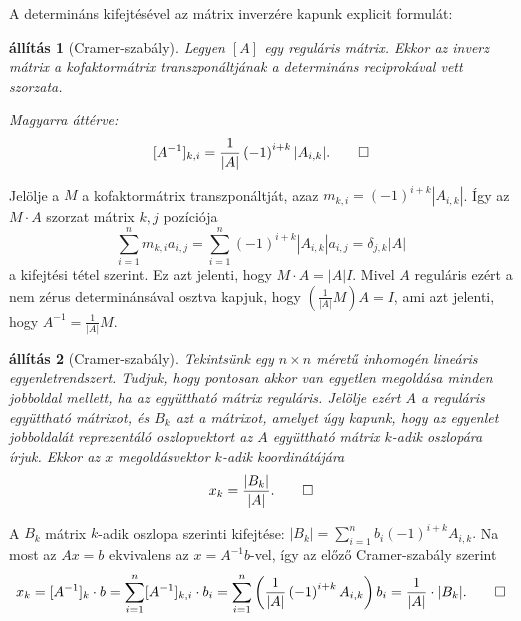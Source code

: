 \documentclass[a4paper, showtrims]{memoir}
\makeatletter
\renewenvironment{proof}[1][\proofname]
    {\par\pushQED{\qed}%
    \normalfont \topsep6\p@\@plus6\p@\relax
    \trivlist
    \item[\hskip\labelsep
        \itshape
    #1\@addpunct{:}]\ignorespaces}
    {\popQED\endtrivlist\@endpefalse}
\theoremstyle{plain}
\newtheorem{proposition}{állítás}[chapter]
\theoremstyle{remark}
\theoremstyle{definition}
\makeatother
\begin{document}
A determináns kifejtésével az mátrix inverzére kapunk explicit formulát:
\begin{proposition}[Cramer-szabály]
	Legyen $[A]$ egy reguláris mátrix.
	Ekkor az inverz mátrix a kofaktormátrix transzponáltjának a determináns reciprokával vett szorzata.

	Magyarra áttérve:
	\[
		[A^{-1}]_{k,i}=\frac{1}{|A|}\left( -1 \right)^{i+k}|A_{i,k}|.\qedhere
	\]
\end{proposition}
\begin{proof}
	Jelölje a $M$ a kofaktormátrix transzponáltját,
	azaz $m_{k,i}=\left( -1 \right)^{i+k}|A_{i,k}|$.
	Így az $M\cdot A$ szorzat mátrix $k,j$ pozíciója
	\[
		\sum_{i=1}^nm_{k,i}a_{i,j}
		=
		\sum_{i=1}^n
		\left( -1 \right)^{i+k}|A_{i,k}|
		a_{i,j}
		=\delta_{j,k}|A|
	\]
	a kifejtési tétel szerint.
	Ez azt jelenti, hogy $M\cdot A=|A|I$.
	Mivel $A$ reguláris ezért a nem zérus determinánsával osztva kapjuk, hogy
	$\left(\frac{1}{|A|}M\right)A=I$,
	ami azt jelenti, hogy $A^{-1}=\frac{1}{|A|}M$.
\end{proof}
\begin{proposition}[Cramer-szabály]
	Tekintsünk egy $n\times n$ méretű inhomogén lineáris egyenletrendszert.
	Tudjuk, hogy pontosan akkor van egyetlen megoldása minden jobboldal mellett,
	ha az együttható mátrix reguláris.
	Jelölje  ezért $A$ a reguláris együttható mátrixot,
	és $B_k$ azt a mátrixot, amelyet úgy kapunk,
	hogy az egyenlet jobboldalát reprezentáló oszlopvektort az $A$ együttható mátrix $k$-adik
	oszlopára írjuk.
	Ekkor az $x$ megoldásvektor $k$-adik koordinátájára
	\[
		x_k=\frac{|B_k|}{|A|}.\qedhere
	\]
\end{proposition}
\begin{proof}
	A $B_k$ mátrix $k$-adik oszlopa szerinti kifejtése:
	\(
	|B_k|
	=
	\sum_{i=1}^nb_i\left( -1 \right)^{i+k}A_{i,k}.
	\)
	Na most az $Ax=b$ ekvivalens az $x=A^{-1}b$-vel,
	így az előző Cramer-szabály szerint
	\[
		x_k=[A^{-1}]_k\cdot b
		=
		\sum_{i=1}^n[A^{-1}]_{k,i}\cdot b_i
		=
		\sum_{i=1}^n\left( \frac{1}{|A|}\left( -1 \right)^{i+k}A_{i,k} \right)b_i
		=
		\frac{1}{|A|}\cdot |B_k|.\qedhere
	\]
\end{proof}
\end{document}
